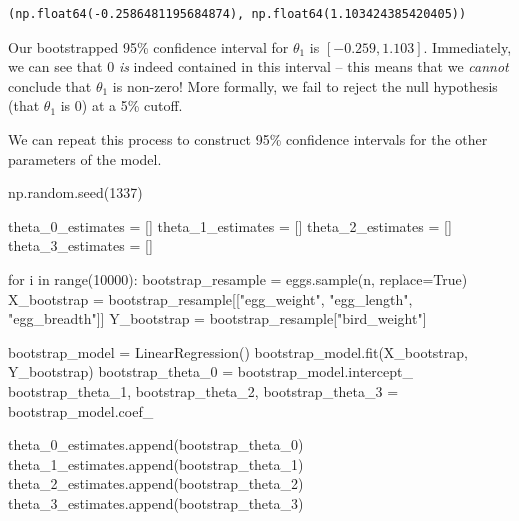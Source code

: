 \documentclass[
  letterpaper,
  DIV=11,
  numbers=noendperiod]{scrreprt}
\newenvironment{Shaded}{\begin{snugshade}}{\end{snugshade}}
\newcommand{\BuiltInTok}[1]{\textcolor[rgb]{0.00,0.23,0.31}{#1}}
\newcommand{\ControlFlowTok}[1]{\textcolor[rgb]{0.00,0.23,0.31}{#1}}
\newcommand{\DecValTok}[1]{\textcolor[rgb]{0.68,0.00,0.00}{#1}}
\newcommand{\KeywordTok}[1]{\textcolor[rgb]{0.00,0.23,0.31}{#1}}
\newcommand{\NormalTok}[1]{\textcolor[rgb]{0.00,0.23,0.31}{#1}}
\newcommand{\OperatorTok}[1]{\textcolor[rgb]{0.37,0.37,0.37}{#1}}
\newcommand{\StringTok}[1]{\textcolor[rgb]{0.13,0.47,0.30}{#1}}
\newcommand{\VariableTok}[1]{\textcolor[rgb]{0.07,0.07,0.07}{#1}}
\begin{document}
\begin{verbatim}
(np.float64(-0.2586481195684874), np.float64(1.103424385420405))
\end{verbatim}

Our bootstrapped 95\% confidence interval for \(\theta_1\) is
\([-0.259, 1.103]\). Immediately, we can see that 0 \emph{is} indeed
contained in this interval -- this means that we \emph{cannot} conclude
that \(\theta_1\) is non-zero! More formally, we fail to reject the null
hypothesis (that \(\theta_1\) is 0) at a 5\% cutoff.

We can repeat this process to construct 95\% confidence intervals for
the other parameters of the model.

\begin{Shaded}
\begin{Highlighting}[]
\NormalTok{np.random.seed(}\DecValTok{1337}\NormalTok{)}

\NormalTok{theta\_0\_estimates }\OperatorTok{=}\NormalTok{ []}
\NormalTok{theta\_1\_estimates }\OperatorTok{=}\NormalTok{ []}
\NormalTok{theta\_2\_estimates }\OperatorTok{=}\NormalTok{ []}
\NormalTok{theta\_3\_estimates }\OperatorTok{=}\NormalTok{ []}


\ControlFlowTok{for}\NormalTok{ i }\KeywordTok{in} \BuiltInTok{range}\NormalTok{(}\DecValTok{10000}\NormalTok{):}
\NormalTok{    bootstrap\_resample }\OperatorTok{=}\NormalTok{ eggs.sample(n, replace}\OperatorTok{=}\VariableTok{True}\NormalTok{)}
\NormalTok{    X\_bootstrap }\OperatorTok{=}\NormalTok{ bootstrap\_resample[[}\StringTok{"egg\_weight"}\NormalTok{, }\StringTok{"egg\_length"}\NormalTok{, }\StringTok{"egg\_breadth"}\NormalTok{]]}
\NormalTok{    Y\_bootstrap }\OperatorTok{=}\NormalTok{ bootstrap\_resample[}\StringTok{"bird\_weight"}\NormalTok{]}
    
\NormalTok{    bootstrap\_model }\OperatorTok{=}\NormalTok{ LinearRegression()}
\NormalTok{    bootstrap\_model.fit(X\_bootstrap, Y\_bootstrap)}
\NormalTok{    bootstrap\_theta\_0 }\OperatorTok{=}\NormalTok{ bootstrap\_model.intercept\_}
\NormalTok{    bootstrap\_theta\_1, bootstrap\_theta\_2, bootstrap\_theta\_3 }\OperatorTok{=}\NormalTok{ bootstrap\_model.coef\_}
    
\NormalTok{    theta\_0\_estimates.append(bootstrap\_theta\_0)}
\NormalTok{    theta\_1\_estimates.append(bootstrap\_theta\_1)}
\NormalTok{    theta\_2\_estimates.append(bootstrap\_theta\_2)}
\NormalTok{    theta\_3\_estimates.append(bootstrap\_theta\_3)}
    

\end{Highlighting}
\end{Shaded}
\end{document}
